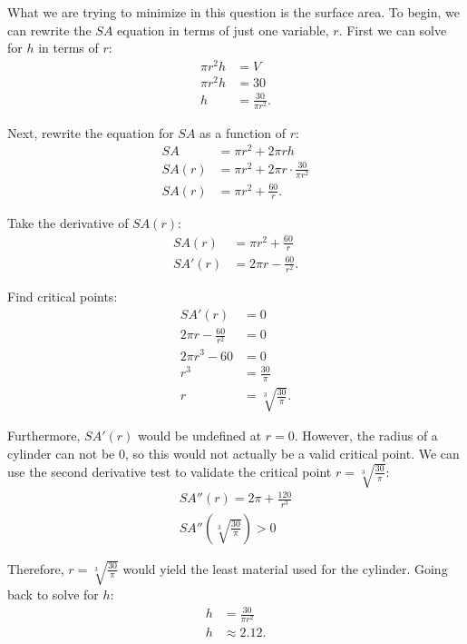 \begin{enumerate}
	What we are trying to minimize in this question is the surface area. To begin, we can rewrite the $SA$ equation in terms of just one variable, $r$. First we can solve for $h$ in terms of $r$:
	\begin{align*}
		\pi r^2 h &= V \\
		\pi r^2 h &= 30 \\
		h &= \frac{30}{\pi r^2}.
	\end{align*}

	Next, rewrite the equation for $SA$ as a function of $r$:
	\begin{align*}
		SA &= \pi r^2 + 2 \pi r h \\
		SA(r) &= \pi r^2 + 2 \pi r \cdot \frac{30}{\pi r^2} \\[5pt]
		SA(r) &= \pi r^2 + \frac{60}{r}.
	\end{align*}

	Take the derivative of $SA(r)$:
	\begin{align*}
		SA(r) &= \pi r^2 + \frac{60}{r} \\[5pt]
		SA'(r) &= 2 \pi r - \frac{60}{r^2}.
	\end{align*}

	Find critical points:
	\begin{align*}
		SA'(r) &= 0 \\
		2 \pi r - \frac{60}{r^2} &= 0 \\
		2 \pi r^3 - 60 &= 0 \\
		r^3 &= \frac{30}{\pi} \\
		r &= \sqrt[3]{\frac{30}{\pi}}.
	\end{align*}

	Furthermore, $SA'(r)$ would be undefined at $r = 0$. However, the radius of a cylinder can not be $0$, so this would not actually be a valid critical point. We can use the second derivative test to validate the critical point $r = \sqrt[3]{\frac{30}{\pi}}$:
	\begin{gather*}
		SA''(r) = 2 \pi + \frac{120}{r^3} \\[5pt]
		SA'' \left( \sqrt[3]{\frac{30}{\pi}} \right) > 0
	\end{gather*}

	Therefore, $r = \sqrt[3]{\frac{30}{\pi}}$ would yield the least material used for the cylinder. Going back to solve for $h$:
	\begin{align*}
		h &= \frac{30}{\pi r^2} \\
		h &\approx 2.12.
	\end{align*}
\end{enumerate}

